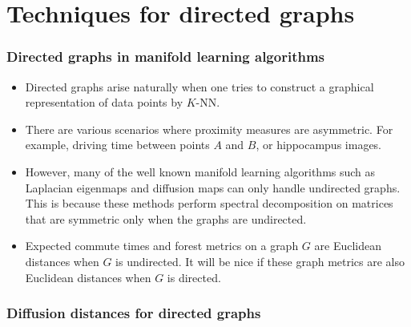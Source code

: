 \documentclass[professionalfonts,hyperref={colorlinks=true,linkcolor=red}]{beamer}
\begin{document}
\section{Techniques for directed graphs}
\begin{frame}
  \frametitle{Directed graphs in manifold learning algorithms}
  \begin{itemize}
  \item<1-> Directed graphs arise naturally when one tries to construct
    a graphical representation of data points by $K$-NN.
  \item<2-> There are various scenarios where proximity measures are
    asymmetric. For example, driving time between points $A$ and $B$,
    or hippocampus images. 
  \item<3-> However, many of the well known manifold learning
    algorithms such as Laplacian eigenmaps and diffusion maps can only
    handle undirected graphs. This is because these methods perform
    spectral decomposition on matrices that are symmetric only
    when the graphs are undirected.
  \item<4-> Expected commute times and forest metrics on a graph $G$
    are Euclidean distances when $G$ is undirected. It will be nice if
    these graph metrics are also Euclidean distances when $G$ is
    directed. 
  \end{itemize}
\end{frame}
\begin{frame}[label=directed_diffusion_distances]
  \frametitle{Diffusion distances for directed graphs}
\end{frame}
\end{document}
